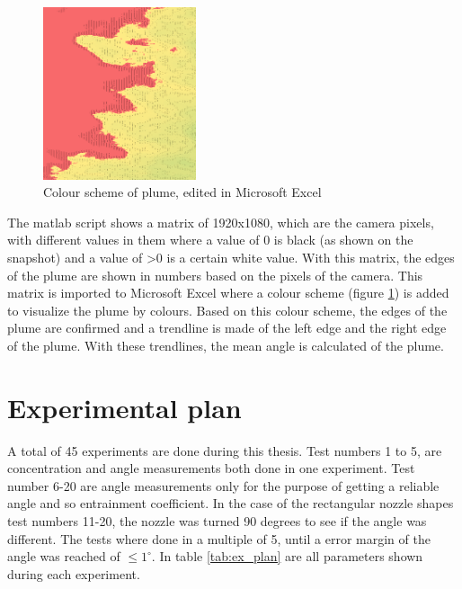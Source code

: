 \begin{figure}[ht!]
    \centering
    \includegraphics[width=0.4\textwidth]{Images/Colourscheme_voorbeeld.png}
    \caption{Colour scheme of plume, edited in Microsoft Excel}
    \label{fig:Excel}
\end{figure}
\newpage
\noindent The matlab script shows a matrix of 1920x1080, which are the camera pixels, with different values in them where a value of 0 is black (as shown on the snapshot) and a value of >0 is a certain white value. With this matrix, the edges of the plume are shown in numbers based on the pixels of the camera. This matrix is imported to Microsoft Excel where a colour scheme (figure \ref{fig:Excel}) is added to visualize the plume by colours. Based on this colour scheme, the edges of the plume are confirmed and a trendline is made of the left edge and the right edge of the plume. With these trendlines, the mean angle is calculated of the plume.
















\section{Experimental plan}
\label{sec:scenario}

A total of 45 experiments are done during this thesis. Test numbers 1 to 5, are concentration and angle measurements both done in one experiment. Test number 6-20 are angle measurements only for the purpose of getting a reliable angle and so entrainment coefficient. In the case of the rectangular nozzle shapes test numbers 11-20, the nozzle was turned 90 degrees to see if the angle was different. The tests where done in a multiple of 5, until a error margin of the angle was reached of $ \leq 1 ^\circ$. In table \ref{tab:ex_plan} are all parameters shown during each experiment.



